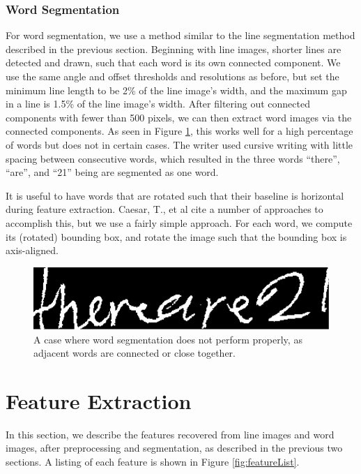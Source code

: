 \documentclass[paper=a4, fontsize=11pt]{scrartcl} %
\numberwithin{equation}{section} %
\numberwithin{figure}{section} %
\numberwithin{table}{section} %
\begin{document}
\subsubsection{Word Segmentation}
For word segmentation, we use a method similar to the line
segmentation method described in the previous section. Beginning with
line images, shorter lines are detected and drawn, such that each word
is its own connected component. We use the same angle and offset
thresholds and resolutions as before, but set the minimum line length
to be 2\% of the line image's width, and the maximum gap in a line is
1.5\% of the line image's width. After filtering out connected
components with fewer than 500 pixels, we can then extract word images
via the connected components. As seen in Figure \ref{fig:wordfail},
this works well for a high percentage of words but does not in certain
cases. The writer used cursive writing with little spacing between
consecutive words, which resulted in the three words ``there'',
``are'', and ``21'' being are segmented as one word.


It is useful to have words that are rotated such that their baseline
is horizontal during feature extraction. Caesar, T., et al
\cite{Preprocessing} cite a number of approaches to accomplish this,
but we use a fairly simple approach. For each word, we compute its
(rotated) bounding box, and rotate the image such that the bounding
box is axis-aligned.

\begin{figure}
  \centering \includegraphics{wordfail.png}
  \caption{A case where word segmentation does not perform properly,
    as adjacent words are connected or close together.}
  \label{fig:wordfail}
\end{figure}


\section{Feature Extraction}
\label{sec:feature}
In this section, we describe the features recovered from line images
and word images, after preprocessing and segmentation, as described in
the previous two sections. A listing of each feature is shown in
Figure \ref{fig:featureList}.
\end{document}
